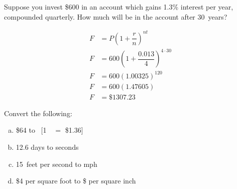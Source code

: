 \documentclass[11pt,letterpaper]{article}
\begin{document}
\newpage



 Suppose you invest \$600 in an account which gains 1.3\% interest per year, compounded quarterly. How much will be in the account after 30~years? \pspace

\sol
	\[
	\begin{aligned}
	F&= P \left(1 + \dfrac{r}{n} \right)^{nt} \\[0.3cm]
	F&= 600 \left(1 + \dfrac{0.013}{4} \right)^{4 \cdot 30} \\[0.3cm]
	F&= 600 (1.00325)^{120} \\[0.3cm]
	F&= 600(1.47605) \\[0.3cm]
	F&= \$1307.23
	\end{aligned}
	\]



\newpage



 Convert the following:
	\begin{enumerate}[(a)]
	\item \$64 to \textsterling\ [1~\textsterling\ $=$ \$1.36]
	\item 12.6 days to seconds
	\item 15~feet per second to mph \textsterling
	\item \$4 per square foot to \$ per square inch
	\end{enumerate} \pspace
\end{document}
